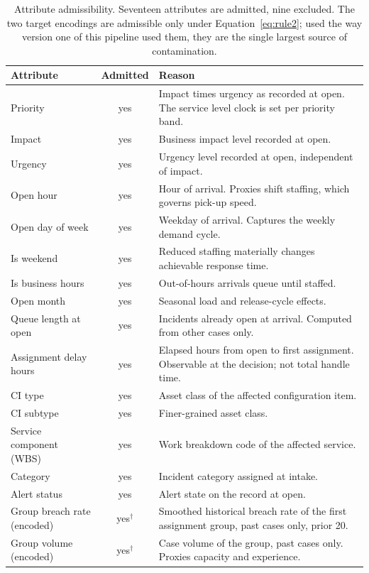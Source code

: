 \begin{table}[htbp]
\centering
\caption{Attribute admissibility. Seventeen attributes are admitted, nine excluded. The two
target encodings are admissible only under Equation~\ref{eq:rule2}; used the way version one of
this pipeline used them, they are the single largest source of contamination.}
\label{tab:attributes}
\small
\begin{tabular}{L{4.0cm} c L{8.4cm}}
\toprule
Attribute & Admitted & Reason \\
\midrule
Priority & yes & Impact times urgency as recorded at open. The service level clock is set per priority band. \\
Impact & yes & Business impact level recorded at open. \\
Urgency & yes & Urgency level recorded at open, independent of impact. \\
Open hour & yes & Hour of arrival. Proxies shift staffing, which governs pick-up speed. \\
Open day of week & yes & Weekday of arrival. Captures the weekly demand cycle. \\
Is weekend & yes & Reduced staffing materially changes achievable response time. \\
Is business hours & yes & Out-of-hours arrivals queue until staffed. \\
Open month & yes & Seasonal load and release-cycle effects. \\
Queue length at open & yes & Incidents already open at arrival. Computed from other cases only. \\
Assignment delay hours & yes & Elapsed hours from open to first assignment. Observable at the decision; not total handle time. \\
CI type & yes & Asset class of the affected configuration item. \\
CI subtype & yes & Finer-grained asset class. \\
Service component (WBS) & yes & Work breakdown code of the affected service. \\
Category & yes & Incident category assigned at intake. \\
Alert status & yes & Alert state on the record at open. \\
Group breach rate (encoded) & yes$^{\dagger}$ & Smoothed historical breach rate of the first assignment group, past cases only, prior 20. \\
Group volume (encoded) & yes$^{\dagger}$ & Case volume of the group, past cases only. Proxies capacity and experience. \\

\end{tabular}
\end{table}
